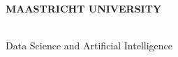 \makeatletter
\begin{titlepage}
\begin{center}

\uppercase{\textbf{\large{Maastricht University}}}
\\[7cm]

\uppercase{\textbf{\large{\@title}}}

\vfill
\@author
\\[3cm]

Data Science and Artificial Intelligence

\@date

\end{center}
\end{titlepage}
\makeatother